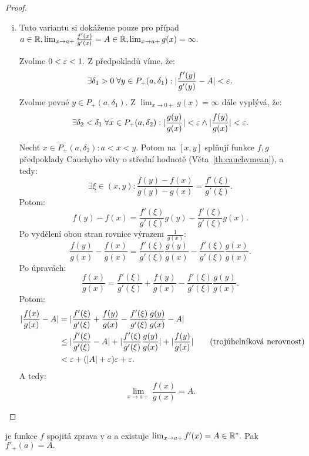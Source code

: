 \begin{proof}
\begin{enumerate}[(i)]
        \item Tuto variantu si dokážeme pouze pro případ 
            $a \in \mathbb{R}, \lim_{x \to a+} \frac{f'(x)}{g'(x)} = A \in \mathbb{R}, 
            \lim_{x \to a+} g(x) = \infty.$

            Zvolme $0<\varepsilon<1.$ Z předpokladů víme, že:
            $$\exists \delta_1 > 0 \; \forall y \in P_+(a, \delta_1): 
            |\frac{f'(y)}{g'(y)} - A| < \varepsilon.$$
            Zvolme pevné $y \in P_+(a, \delta_1).$ Z $\lim_{x \to 0+} g(x) = \infty$
            dále vyplývá, že:
            $$\exists \delta_2 < \delta_1 \; \forall x \in P_+(a, \delta_2):
            |\frac{g(y)}{g(x)}| < \varepsilon \land |\frac{f(y)}{g(x)}| < \varepsilon.$$

            Nechť $x \in P_+(a, \delta_2): a < x < y.$ Potom na $[x,y]$ splňují
            funkce $f,g$ předpoklady Cauchyho věty o střední hodnotě 
            (Věta~\ref{th:cauchymean}), a tedy:
            $$\exists \xi \in (x,y): \frac{f(y) - f(x)}{g(y)-g(x)} = 
            \frac{f'(\xi)}{g'(\xi)}.$$
            Potom:
            $$f(y) - f(x) = \frac{f'(\xi)}{g'(\xi)} g(y) - 
            \frac{f'(\xi)}{g'(\xi)} g(x).$$
            Po vydělení obou stran rovnice výrazem $\frac{1}{g(x)}:$
            $$\frac{f(y)}{g(x)} - \frac{f(x)}{g(x)} = 
            \frac{f'(\xi)}{g'(\xi)}\frac{g(y)}{g(x)} - 
            \frac{f'(\xi)}{g'(\xi)}\frac{g(x)}{g(x)}.$$
            Po úpravách:
            $$\frac{f(x)}{g(x)}  =\frac{f'(\xi)}{g'(\xi)} + 
            \frac{f(y)}{g(x)} -\frac{f'(\xi)}{g'(\xi)}\frac{g(y)}{g(x)}.$$
            Potom:
            \begin{align*}
                |\frac{f(x)}{g(x)} - A| &= |\frac{f'(\xi)}{g'(\xi)} + 
                \frac{f(y)}{g(x)} -\frac{f'(\xi)}{g'(\xi)}\frac{g(y)}{g(x)} - A| \\
                &\leq |\frac{f'(\xi)}{g'(\xi)} - A| + 
                |\frac{f'(\xi)}{g'(\xi)}\frac{g(y)}{g(x)}| +
                |\frac{f(y)}{g(x)}| \tag{trojúhelníková nerovnost} \\
                &< \varepsilon + (|A| + \varepsilon)\varepsilon + \varepsilon.
            \end{align*}
            A tedy:
            $$\lim_{x \to a+} \frac{f(x)}{g(x)} = A.$$
    \end{enumerate}
\end{proof}

\begin{theorem}
    \label{th:derlimder}
    \Necht je funkce $f$ spojitá zprava v $a$ a \necht existuje $\lim_{x \to a+}
    f'(x) = A \in \mathbb{R}^*.$ Pak $f'_+(a) = A.$
\end{theorem}


